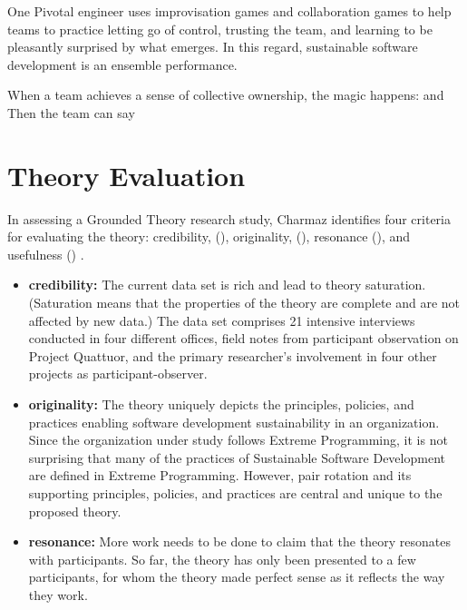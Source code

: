 \begin{table}[]
One Pivotal engineer uses improvisation games and collaboration games to help teams to practice letting go of control, trusting the team, and learning to be pleasantly surprised by what emerges. In this regard, sustainable software development is an ensemble performance. 

When a team achieves a sense of collective ownership, the magic happens:  and  Then the team can say 
\section{Theory Evaluation}
\label{TheoryEvaluation}

In assessing a Grounded Theory research study, Charmaz identifies four criteria for evaluating the theory: credibility, (), originality, (), resonance (), and usefulness () \cite{StolGTinSE}. 

\begin{itemize}
\item 
\textbf{credibility:}  The current data set is rich and lead to theory saturation. (Saturation means that the properties of the theory are complete and are not affected by new data.) The data set comprises 21 intensive interviews conducted in four different offices,  field notes from participant observation on Project Quattuor, and the primary researcher's involvement in four other projects as participant-observer.

\item
\textbf{originality:} The theory uniquely depicts the principles, policies, and practices enabling software development sustainability in an organization. Since the organization under study follows Extreme Programming, it is not surprising that many of the practices of Sustainable Software Development are defined in Extreme Programming. However, pair rotation and its supporting principles, policies, and practices are central and unique to the proposed theory.

\item
\textbf{resonance:} More work needs to be done to claim that the theory resonates with participants. So far, the theory has only been presented to a few participants, for whom the theory made perfect sense as it reflects the way they work. 


\end{itemize}
\end{table}
